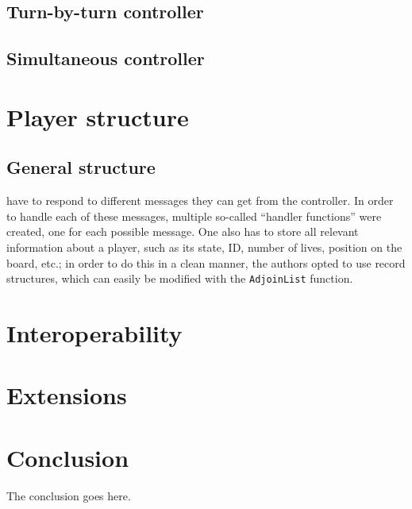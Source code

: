 \documentclass[12pt,journal]{IEEEtran}
\begin{document}
\subsection{Turn-by-turn controller}

\subsection{Simultaneous controller}

\section{Player structure}

\subsection{General structure}
 have to respond to different messages they can get from the controller.
In order to handle each of these messages, multiple so-called ``handler functions'' were created, one for each possible message.
One also has to store all relevant information about a player, such as its state, ID, number of lives, position on the board, etc.; in order to do this in a clean manner, the authors opted to use record structures, which can easily be modified with the \lstinline|AdjoinList| function.

\section{Interoperability}

\section{Extensions}

\section{Conclusion}
The conclusion goes here.

\end{document}
